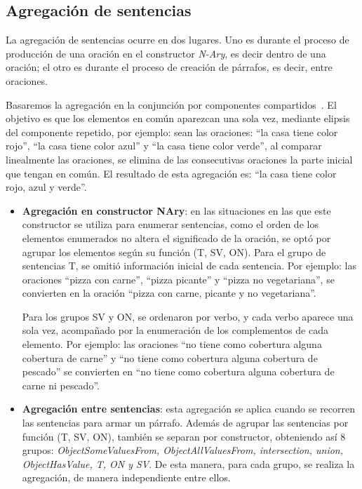 \subsection{Agregación de sentencias}
La agregación de sentencias ocurre en dos lugares. Uno es durante el proceso de producción de una oración en el constructor \emph{N-Ary}, es decir dentro de una oración; el otro es durante el proceso de creación de párrafos, es decir, entre oraciones.

Basaremos la agregación en la conjunción por componentes compartidos~\cite{bernardos2003marco}. El objetivo es que los elementos en común aparezcan una sola vez, mediante elipsis del componente repetido, por ejemplo: sean las oraciones: ``la casa tiene color rojo'', ``la casa tiene color azul'' y ``la casa tiene color verde'', al comparar linealmente las oraciones, se elimina de las consecutivas oraciones la parte inicial que tengan en común. El resultado de esta agregación es: ``la casa tiene color rojo, azul y verde''.
    
\begin{itemize}
    \item {\bf Agregación en constructor NAry}: en las situaciones en las que este constructor se utiliza para enumerar sentencias, como el orden de los elementos enumerados no altera el significado de la oración, se optó por agrupar los elementos según su función (T, SV, ON). Para el grupo de sentencias T, se omitió información inicial de cada sentencia. Por ejemplo: las oraciones ``pizza con carne'', ``pizza picante'' y ``pizza no vegetariana'', se convierten en la oración ``pizza con carne, picante y no vegetariana''.
    
    Para los grupos SV y ON, se ordenaron por verbo, y cada verbo aparece una sola vez, acompañado por la enumeración de los complementos de cada elemento. Por ejemplo: las oraciones ``no tiene como cobertura alguna cobertura de carne'' y ``no tiene como cobertura alguna cobertura de pescado'' se convierten en ``no tiene como cobertura alguna cobertura de carne ni pescado''.
    
    \item {\bf Agregación entre sentencias}: esta agregación se aplica cuando se recorren las sentencias para armar un párrafo. Además de agrupar las sentencias por función (T, SV, ON), también se separan por constructor, obteniendo así 8 grupos: \emph{ObjectSomeValuesFrom, ObjectAllValuesFrom, intersection, union, ObjectHasValue, T, ON y SV}. De esta manera, para cada grupo, se realiza la agregación, de manera independiente entre ellos.
\end{itemize}

